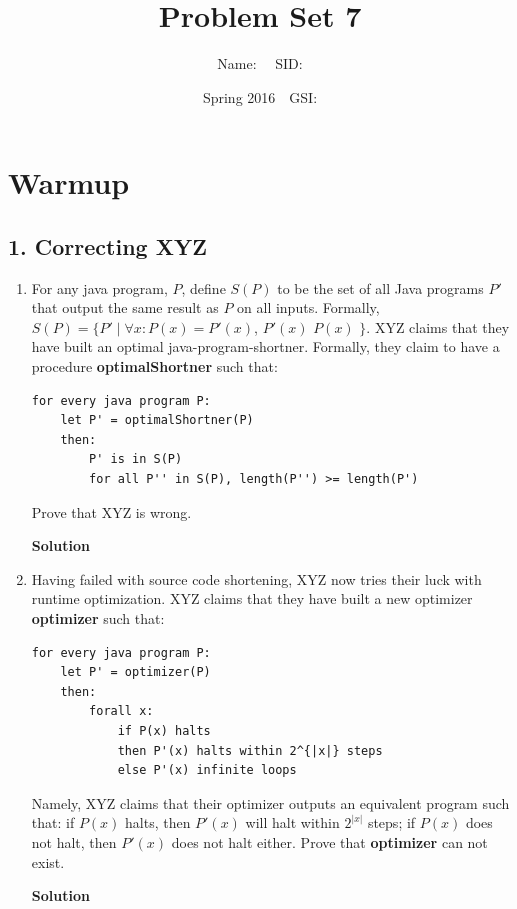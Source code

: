 \documentclass{article}\usepackage{amsmath,amssymb,amsthm,tikz,tkz-graph,color,chngpage,soul,hyperref,csquotes,graphicx,floatrow}\newcommand*{\QEDB}{\hfill\ensuremath{\square}}\newtheorem*{prop}{Proposition}\renewcommand{\theenumi}{\alph{enumi}}\usepackage[shortlabels]{enumitem}\usepackage[nobreak=true]{mdframed}\usetikzlibrary{matrix,calc}\MakeOuterQuote{"}\usepackage[margin=0.75in]{geometry} \newtheorem{theorem}{Theorem}
\title{Problem Set 7}
\author{Name: $\quad$SID: }
\date{Spring 2016$\quad$GSI: }
\begin{document}
\maketitle

\section*{Warmup}

\subsection*{1. Correcting XYZ}
\begin{enumerate}
\item For any java program, $P$, define $S(P)$ to be the set of all Java programs $P'$ that output the same result as $P$ on all inputs. Formally, $S(P)=\{P'\mid\forall x:P(x)=P'(x)$, $P'(x)$  $P(x)$ $\}$. XYZ claims that they have built an optimal java-program-shortner. Formally, they claim to have a procedure \textbf{optimalShortner} such that:
\begin{center}
\begin{BVerbatim}
for every java program P:
    let P' = optimalShortner(P)
    then:
        P' is in S(P)
        for all P'' in S(P), length(P'') >= length(P')
\end{BVerbatim}
\end{center}
Prove that XYZ is wrong.
\begin{mdframed}
\textbf{Solution}

\end{mdframed}
\item Having failed with source code shortening, XYZ now tries their luck with runtime optimization. XYZ claims that they have built a new optimizer \textbf{optimizer} such that:
\begin{center}
\begin{BVerbatim}
for every java program P:
    let P' = optimizer(P)
    then:
        forall x:
            if P(x) halts
            then P'(x) halts within 2^{|x|} steps
            else P'(x) infinite loops
\end{BVerbatim}
\end{center}
Namely, XYZ claims that their optimizer outputs an equivalent program such that: if $P(x)$ halts, then $P'(x)$ will halt within $2^{|x|}$ steps; if $P(x)$ does not halt, then $P'(x)$ does not halt either. Prove that \textbf{optimizer} can not exist.
\begin{mdframed}
\textbf{Solution}


\end{mdframed}
\end{enumerate}
\end{document}
